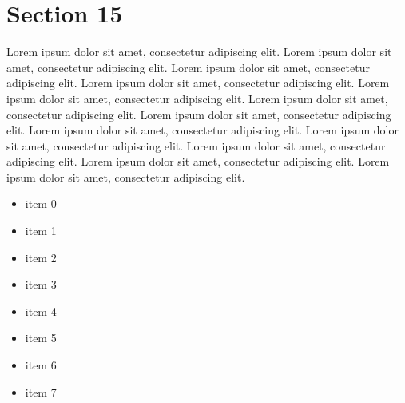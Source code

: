 \documentclass{article}
\begin{document}
\section{Section 15}
Lorem ipsum dolor sit amet, consectetur adipiscing elit. Lorem ipsum dolor sit amet, consectetur adipiscing elit. Lorem ipsum dolor sit amet, consectetur adipiscing elit. Lorem ipsum dolor sit amet, consectetur adipiscing elit. Lorem ipsum dolor sit amet, consectetur adipiscing elit. Lorem ipsum dolor sit amet, consectetur adipiscing elit. Lorem ipsum dolor sit amet, consectetur adipiscing elit. Lorem ipsum dolor sit amet, consectetur adipiscing elit. Lorem ipsum dolor sit amet, consectetur adipiscing elit. Lorem ipsum dolor sit amet, consectetur adipiscing elit. Lorem ipsum dolor sit amet, consectetur adipiscing elit. Lorem ipsum dolor sit amet, consectetur adipiscing elit. 
\begin{itemize}
\item item 0
\item item 1
\item item 2
\item item 3
\item item 4
\item item 5
\item item 6
\item item 7
\end{itemize}
\end{document}
